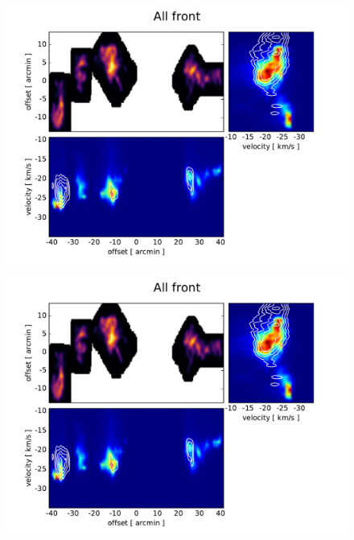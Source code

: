 \documentclass[traditabstract]{aa}
\begin{document}
\begin{figure}[h]
  \centering
  \includegraphics[page=6,width=14cm,trim=30 10 55 30,clip=true]{Figures/PV_diagrams.pdf}
  \caption{}
\end{figure}


\begin{figure}[h]
  \centering
  \includegraphics[page=8,width=14cm,trim=30 10 55 30,clip=true]{Figures/PV_diagrams.pdf}
  \caption{}
\end{figure}
\end{document}

